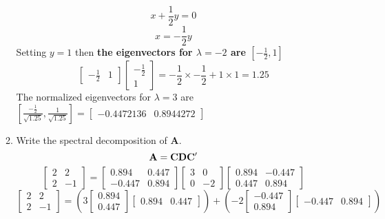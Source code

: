 \documentclass[12pt,a4paper]{paper}
\begin{document}
\begin{enumerate}
\begin{enumerate}
\begin{multicols}{2}
\begin{equation}
\end{equation}
\begin{equation}
x+\frac{1}{2}y=0
\end{equation}
\begin{equation}
x=-\frac{1}{2}y
\end{equation}
Setting $y = 1$ then \textbf{the eigenvectors for $\lambda = -2$ are $\left[-\frac{1}{2}, 1\right]$}
\begin{equation}
\left[\begin{array}{cc}-\frac{1}{2} & 1\end{array}\right] \left[\begin{array}{c}-\frac{1}{2} \\ 1\end{array}\right] = -\frac{1}{2} \times -\frac{1}{2} + 1 \times 1 = 1.25
\end{equation}
The normalized eigenvectors for $\lambda = 3$ are $\left[\frac{-\frac{1}{2}}{\sqrt{1.25}}, \frac{1}{\sqrt{1.25}}\right] = \left[\begin{array}{cc}-0.4472136 & 0.8944272\end{array}\right]$
\end{multicols}
\item Write the spectral decomposition of \textbf{A}.
\begin{equation}
\textbf{\text{A}} = \textbf{\text{CDC}$'$}
\end{equation}
\begin{equation}
\left[\begin{array}{cc}2 & 2 \\ 2 & -1\end{array}\right] = \left[\begin{array}{cc}0.894 & 0.447 \\-0.447 & 0.894\end{array}\right]\left[\begin{array}{cc}3 & 0 \\ 0 & -2\end{array}\right]\left[\begin{array}{cc}0.894 & -0.447 \\ 0.447 & 0.894\end{array}\right]
\end{equation}
\begin{equation}
\left[\begin{array}{cc}2 & 2 \\ 2 & -1\end{array}\right] = \left(3 \left[\begin{array}{c}0.894 \\ 0.447\end{array}\right]\left[\begin{array}{cc}0.894 & 0.447\end{array}\right]\right) + \left(-2 \left[\begin{array}{c}-0.447 \\ 0.894\end{array}\right]\left[\begin{array}{cc}-0.447 & 0.894\end{array}\right]\right)

\end{equation}
\end{enumerate}
\end{enumerate}
\end{document}
